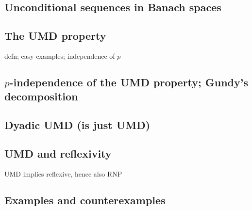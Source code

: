 \subsection{Unconditional sequences in Banach spaces}

\subsection{The UMD property}

defn; easy examples; independence of $p$

\subsection{$p$-independence of the UMD property; Gundy's decomposition}

\subsection{Dyadic UMD (is just UMD)}

\subsection{UMD and reflexivity}

UMD implies reflexive, hence also RNP

\subsection{Examples and counterexamples}

